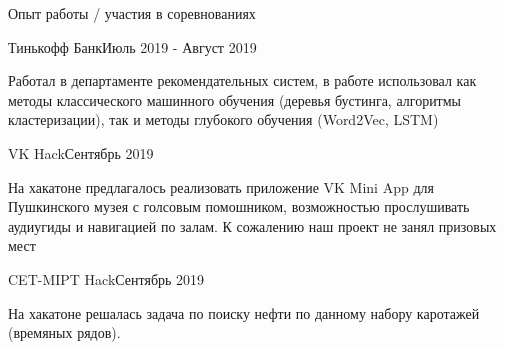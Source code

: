 \documentclass{resume} %
\begin{document}
\begin{rSection}{Опыт работы / участия в соревнованиях}

\begin{rSubsection}{Тинькофф Банк}{Июль 2019 - Август 2019}{}{}
\item Работал в департаменте рекомендательных систем, в работе использовал как методы классического машинного обучения (деревья бустинга, алгоритмы кластеризации),  так и методы глубокого обучения (Word2Vec, LSTM)
\end{rSubsection}

\begin{rSubsection}{VK Hack}{Сентябрь 2019}{}{}
\item На хакатоне предлагалось реализовать приложение VK Mini App для Пушкинского музея с голсовым помошником, возможностью прослушивать аудиугиды и навигацией по залам. К сожалению наш проект не занял призовых мест 
\end{rSubsection}

\begin{rSubsection}{CET-MIPT Hack}{Сентябрь 2019}{}{}
\item На хакатоне решалась задача по поиску нефти по данному набору каротажей (времяных рядов). 
\end{rSubsection}

\end{rSection}
\end{document}
